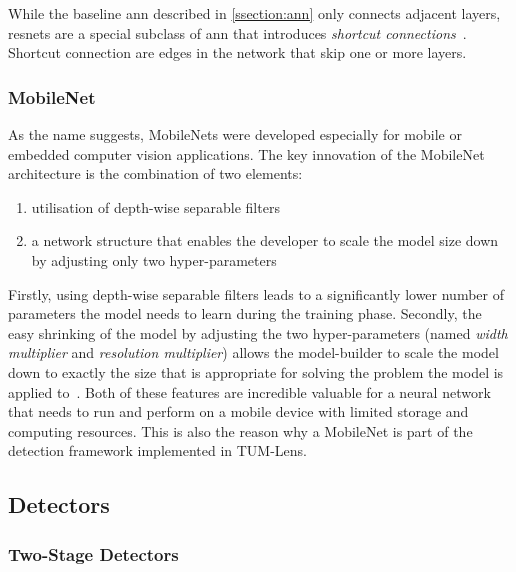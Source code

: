 \documentclass[
			   fontsize=11pt,
               paper=a4,
               bibliography=totoc,
               idxtotoc,
               headsepline,
               footsepline,
               footinclude=false,
               BCOR=12mm,
               DIV=13,
               openany,   %
               ]
               {scrbook}
\begin{document}
While the baseline \gls{ann} described in \autoref{ssection:ann} only connects adjacent layers, \glspl{resnet} are a special subclass of \gls{ann} that introduces \textit{shortcut connections}~\cite{backboneResNet}. Shortcut connection are edges in the network that skip one or more layers.

\subsubsection{MobileNet} \label{sssec:mobilenet}
As the name suggests, MobileNets were developed especially for mobile or embedded computer vision applications. The key innovation of the MobileNet architecture is the combination of two elements:
\begin{enumerate}
	\item utilisation of depth-wise separable filters~\cite{depthSep}
	\item a network structure that enables the developer to scale the model size down by adjusting only two hyper-parameters
\end{enumerate}

\noindent Firstly, using depth-wise separable filters leads to a significantly lower number of parameters the model needs to learn during the training phase. Secondly, the easy shrinking of the model by adjusting the two hyper-parameters (named \textit{width multiplier} and \textit{resolution multiplier}) allows the model-builder to scale the model down to exactly the size that is appropriate for solving the problem the model is applied to~\cite{backboneMobileNet}. Both of these features are incredible valuable for a neural network that needs to run and perform on a mobile device with limited storage and computing resources. This is also the reason why a MobileNet is part of the detection framework implemented in TUM-Lens.

\subsection{Detectors}


\subsubsection{Two-Stage Detectors}
\end{document}
